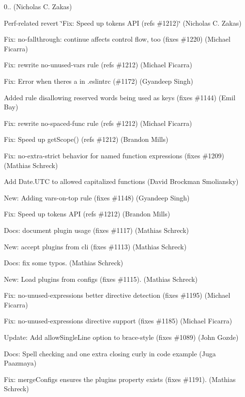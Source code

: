 \begin{DoxyItemize}
\item 0.. (Nicholas C. Zakas)
\item Perf-\/related revert \char`\"{}\+Fix\+: Speed up tokens A\+P\+I (refs \#1212)\char`\"{} (Nicholas C. Zakas)
\item Fix\+: no-\/fallthrough\+: continue affects control flow, too (fixes \#1220) (Michael Ficarra)
\item Fix\+: rewrite no-\/unused-\/vars rule (refs \#1212) (Michael Ficarra)
\item Fix\+: Error when there\textquotesingle{}s a  in .eslintrc (\#1172) (Gyandeep Singh)
\item Added rule disallowing reserved words being used as keys (fixes \#1144) (Emil Bay)
\item Fix\+: rewrite no-\/spaced-\/func rule (refs \#1212) (Michael Ficarra)
\item Fix\+: Speed up get\+Scope() (refs \#1212) (Brandon Mills)
\item Fix\+: no-\/extra-\/strict behavior for named function expressions (fixes \#1209) (Mathias Schreck)
\item Add Date.\+U\+TC to allowed capitalized functions (David Brockman Smoliansky)
\item New\+: Adding \textquotesingle{}vars-\/on-\/top\textquotesingle{} rule (fixes \#1148) (Gyandeep Singh)
\item Fix\+: Speed up tokens A\+PI (refs \#1212) (Brandon Mills)
\item Docs\+: document plugin usage (fixes \#1117) (Mathias Schreck)
\item New\+: accept plugins from cli (fixes \#1113) (Mathias Schreck)
\item Docs\+: fix some typos. (Mathias Schreck)
\item New\+: Load plugins from configs (fixes \#1115). (Mathias Schreck)
\item Fix\+: no-\/unused-\/expressions better directive detection (fixes \#1195) (Michael Ficarra)
\item Fix\+: no-\/unused-\/expressions directive support (fixes \#1185) (Michael Ficarra)
\item Update\+: Add \textquotesingle{}allow\+Single\+Line\textquotesingle{} option to brace-\/style (fixes \#1089) (John Gozde)
\item Docs\+: Spell checking and one extra closing curly in code example (Juga Paazmaya)
\item Fix\+: merge\+Configs ensures the plugins property exists (fixes \#1191). (Mathias Schreck)

\end{DoxyItemize}
